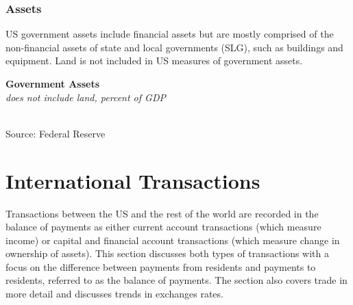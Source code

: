 \documentclass{report}
\makeatletter
\newcommand{\tbllink}[1]{\href{https://raw.githubusercontent.com/bdecon/US-chartbook/master/chartbook/data/#1}{\faTable}}
\newcommand*\short[1]{\expandafter\@gobbletwo\number\numexpr#1\relax}
\newcommand{\sbar}[4]{
		\addplot[ybar stacked, bar width=2.4pt, draw opacity=0, fill=#1] 
			table [x=#2, y=#3, col sep=comma]{#4};}
\newcommand{\dateaxisticks}{
		date coordinates in=x, axis line style={draw=none},
		xmax={2023-02-15},
		max space between ticks=40,	    
		xtick={{1990-01-01}, {1992-01-01}, {1994-01-01}, 
			{1996-01-01}, {1998-01-01}, {2000-01-01}, 
			{2002-01-01}, {2004-01-01}, {2006-01-01},
			{2008-01-01}, {2010-01-01}, {2012-01-01}, {2014-01-01},
		    {2016-01-01}, {2018-01-01}, {2020-01-01}, {2022-01-01}, 
		    {2024-01-01}, {2026-01-01}},
		minor xtick={{1989-01-01}, {1991-01-01}, {1993-01-01},
			{1995-01-01}, {1997-01-01}, {1999-01-01}, 
			{2001-01-01}, {2003-01-01}, {2005-01-01}, {2007-01-01},
		    {2009-01-01}, {2011-01-01}, {2013-01-01}, {2015-01-01},
		    {2017-01-01}, {2019-01-01}, {2021-01-01}, {2023-01-01}, 
		    {2025-01-01}, {2027-01-01}},
		enlarge y limits={0.06}, enlarge x limits={0.01},
		}
\newcommand{\bbar}[2]{extra #1 ticks = {{#2}}, extra #1 tick labels = ,
		extra #1 tick style = {grid=major, grid style={thick, black!25}},}
\newcommand{\rbars}{
		\fill[color=black!10] (axis cs:{1990-07-01},\pgfkeysvalueof{/pgfplots/ymin}) rectangle 
			(axis cs:{1991-03-01}, \pgfkeysvalueof{/pgfplots/ymax});
		\fill[color=black!10] (axis cs:{2007-12-01},\pgfkeysvalueof{/pgfplots/ymin}) rectangle 
			(axis cs:{2009-07-01}, \pgfkeysvalueof{/pgfplots/ymax});
		\fill[color=black!10] (axis cs:{2001-03-01},\pgfkeysvalueof{/pgfplots/ymin}) rectangle 
			(axis cs:{2001-11-01}, \pgfkeysvalueof{/pgfplots/ymax});
		\fill[color=black!10] (axis cs:{2020-02-01},\pgfkeysvalueof{/pgfplots/ymin}) rectangle 
			(axis cs:{2020-05-01}, \pgfkeysvalueof{/pgfplots/ymax});}
\makeatother
\begin{document}
{\begin{minipage}{0.76\textwidth}
\subsubsection*{Assets}
\small US government assets include financial assets but are mostly comprised of the non-financial assets of state and local governments (SLG), such as buildings and equipment. Land is not included in US measures of government assets. 


\vspace{2mm}

\normalsize \textbf{Government Assets}\\
\footnotesize{\textit{does not include land, percent of GDP}}\\
\hspace*{-2mm} \\
\footnotesize{Source: Federal Reserve} \hfill \tbllink{govassets.csv}
\end{minipage}
\newpage
\hypertarget{ext}{}
\section*{International Transactions}
\begin{minipage}{0.76\textwidth}
\small Transactions between the US and the rest of the world are recorded in the balance of payments as either current account transactions (which measure income) or capital and financial account transactions (which measure change in ownership of assets). This section discusses both types of transactions with a focus on the difference between payments from residents and payments to residents, referred to as the balance of payments. The section also covers trade in more detail and discusses trends in exchanges rates. 


\end{minipage}}
\end{document}
